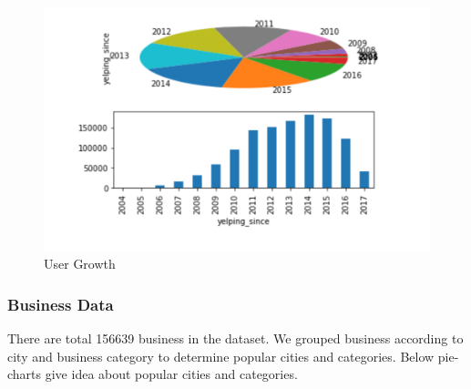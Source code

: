 \documentclass[11pt]{article}
\begin{document}
	      \begin{figure}[h]
	     	\centering
	     	\includegraphics[scale=0.5] {user_growth.png}
	     	\caption{User Growth}
	     \end{figure}
     
     	\subsubsection{Business Data}
     	There are total 156639 business in the dataset. We grouped business according to city and business category to determine popular cities and categories. Below pie-charts give idea about popular cities and categories.
     	
\end{document}
